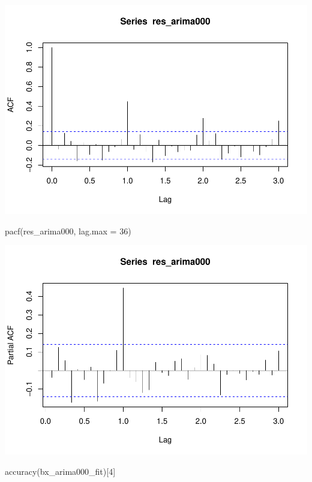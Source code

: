 \documentclass[
]{article}
\newenvironment{Shaded}{\begin{snugshade}}{\end{snugshade}}
\newcommand{\AttributeTok}[1]{\textcolor[rgb]{0.77,0.63,0.00}{#1}}
\newcommand{\DecValTok}[1]{\textcolor[rgb]{0.00,0.00,0.81}{#1}}
\newcommand{\FunctionTok}[1]{\textcolor[rgb]{0.00,0.00,0.00}{#1}}
\newcommand{\NormalTok}[1]{#1}
\begin{document}
\includegraphics{eighth_meeting_notes_files/figure-latex/arima000-1.pdf}

\begin{Shaded}
\begin{Highlighting}[]
\FunctionTok{pacf}\NormalTok{(res\_arima000, }\AttributeTok{lag.max =} \DecValTok{36}\NormalTok{)}
\end{Highlighting}
\end{Shaded}

\includegraphics{eighth_meeting_notes_files/figure-latex/arima000-2.pdf}

\begin{Shaded}
\begin{Highlighting}[]
\FunctionTok{accuracy}\NormalTok{(bx\_arima000\_fit)[}\DecValTok{4}\NormalTok{]}
\end{Highlighting}
\end{Shaded}
\end{document}
